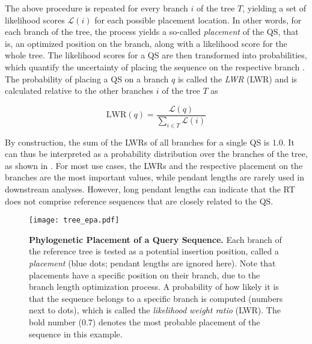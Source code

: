 The above procedure is repeated for every branch $i$ of the tree $T$,
yielding a set of likelihood scores $\mathcal{L}(i)$ for each possible placement location.
In other words, for each branch of the tree, the process yields a so-called \emph{placement} of the \ac{QS},
that is, an optimized position on the branch, along with a likelihood score for the whole tree.
The likelihood scores for a \ac{QS} are then transformed into probabilities,
which quantify the uncertainty of placing the sequence on the respective branch \cite{Strimmer2002,VonMering2007}.
The probability of placing a \ac{QS} on a branch $q$ is called the \emph{\acl{LWR}}
(\acs{LWR}) %
and is calculated relative to the other branches $i$ of the tree $T$ as

\begin{equation}
    \label{ch:Foundations:sec:PhylogeneticPlacement:eq:LWR}
    \mbox{LWR}(q) =  \frac{ \mathcal{L}( q )}{ \sum_{i \in T} \mathcal{L}( i )}
\end{equation}

By construction, the sum of the \acp{LWR} of all branches for a single \ac{QS} is $1.0$.
It can thus be interpreted as a probability distribution over the branches of the tree,
as shown in .
For most use cases, the \acp{LWR} and the respective placement on the branches are the most important values,
while pendant lengths are rarely used in downstream analyses.
However, long pendant lengths can indicate that the \ac{RT} does not comprise reference sequences
that are closely related to the \ac{QS}.

\begin{figure}[hpbt]
    \centering
    \texttt{[image: tree\_epa.pdf]}
    \caption[Phylogenetic Placement of a Query Sequence]{
        \textbf{Phylogenetic Placement of a Query Sequence.}
        Each branch of the reference tree is tested as a potential insertion position, called a \emph{placement}
        (blue dots; pendant lengths are ignored here).
        Note that placements have a specific position on their branch, due to the branch length optimization process.
        A probability of how likely it is that the sequence belongs to a specific branch is computed
        (numbers next to dots),
        which is called the \emph{likelihood weight ratio} (LWR).
        The bold number (0.7) denotes the most probable placement of the sequence in this example.
    }
    \label{fig:tree_epa}
\end{figure}


